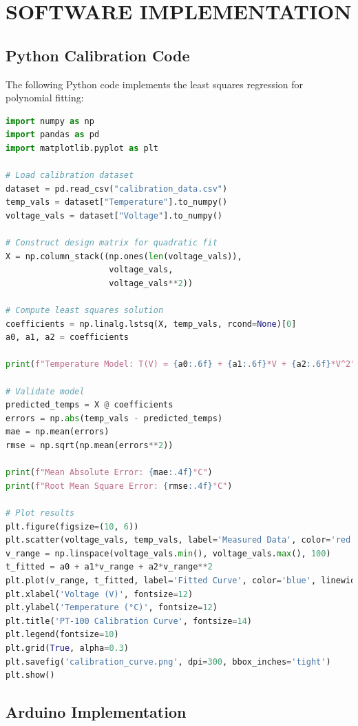 \documentclass[journal]{IEEEtran}
\begin{document}
\section{\textbf{SOFTWARE IMPLEMENTATION}}

\subsection{\textbf{Python Calibration Code}}

The following Python code implements the least squares regression for polynomial fitting:

\begin{lstlisting}[language=Python, frame=single, breaklines=true]
import numpy as np
import pandas as pd
import matplotlib.pyplot as plt

# Load calibration dataset
dataset = pd.read_csv("calibration_data.csv")
temp_vals = dataset["Temperature"].to_numpy()
voltage_vals = dataset["Voltage"].to_numpy()

# Construct design matrix for quadratic fit
X = np.column_stack((np.ones(len(voltage_vals)), 
                     voltage_vals, 
                     voltage_vals**2))

# Compute least squares solution
coefficients = np.linalg.lstsq(X, temp_vals, rcond=None)[0]
a0, a1, a2 = coefficients

print(f"Temperature Model: T(V) = {a0:.6f} + {a1:.6f}*V + {a2:.6f}*V^2")

# Validate model
predicted_temps = X @ coefficients
errors = np.abs(temp_vals - predicted_temps)
mae = np.mean(errors)
rmse = np.sqrt(np.mean(errors**2))

print(f"Mean Absolute Error: {mae:.4f}°C")
print(f"Root Mean Square Error: {rmse:.4f}°C")

# Plot results
plt.figure(figsize=(10, 6))
plt.scatter(voltage_vals, temp_vals, label='Measured Data', color='red', s=50)
v_range = np.linspace(voltage_vals.min(), voltage_vals.max(), 100)
t_fitted = a0 + a1*v_range + a2*v_range**2
plt.plot(v_range, t_fitted, label='Fitted Curve', color='blue', linewidth=2)
plt.xlabel('Voltage (V)', fontsize=12)
plt.ylabel('Temperature (°C)', fontsize=12)
plt.title('PT-100 Calibration Curve', fontsize=14)
plt.legend(fontsize=10)
plt.grid(True, alpha=0.3)
plt.savefig('calibration_curve.png', dpi=300, bbox_inches='tight')
plt.show()
\end{lstlisting}

\subsection{\textbf{Arduino Implementation}}
\end{document}
